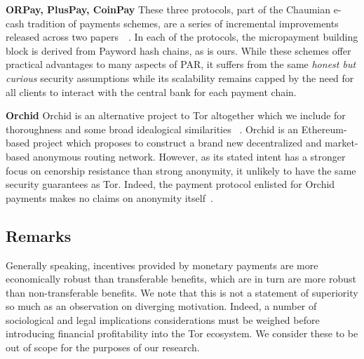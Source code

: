 \textbf{ORPay, PlusPay, CoinPay} These three protocols, part of the Chaumian
e-cash tradition of payments schemes, are a series of incremental improvements
released across two papers~\cite{chen2009xpay}~\cite{carbunar2012tipping}. In
each of the protocols, the micropayment building block is derived from Payword
hash chains, as is ours. While these schemes offer practical advantages to many
aspects of PAR, it suffers from the same \emph{honest but curious} security
assumptions while its scalability remains capped by the need for all clients to
interact with the central bank for each payment chain.

\textbf{Orchid} Orchid is an alternative project to Tor altogether which we
include for thoroughness and some broad idealogical similarities
~\cite{salamon2018orchid}. Orchid is an Ethereum-based project which proposes to
construct a brand new decentralized and market-based anonymous routing
network. However, as its stated intent has a stronger focus on cenorship
resistance than strong anonymity, it unlikely to have the same security
guarantees as Tor. Indeed, the payment protocol enlisted for Orchid payments
makes no claims on anonymity itself~\cite{pass2015micropayments}.

\subsection{Remarks}

Generally speaking, incentives provided by monetary payments are more
economically robust than transferable benefits, which are in turn are more
robust than non-transferable benefits. We note that this is not a statement of
superiority so much as an observation on diverging motivation. Indeed, a number
of sociological and legal implications considerations must be weighed before
introducing financial profitability into the Tor ecosystem. We consider these to
be out of scope for the purposes of our research.

